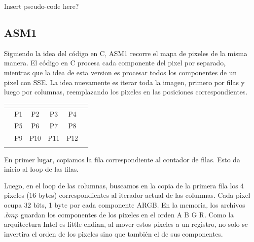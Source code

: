 Insert pseudo-code here?

\pagebreak

\subsection{ASM1}
Siguiendo la idea del código en C, ASM1 recorre el mapa de pixeles de la misma manera. El código en C procesa cada componente del pixel por separado, mientras que la idea de esta version es procesar todos los componentes de un pixel con SSE. La idea nuevamente es iterar toda la imagen, primero por filas y luego por columnas, reemplazando los pixeles en las posiciones correspondientes.

\begin{table}[h]
\mem
\begin{tabular}{l|c|c|c|c|l}
 & \multicolumn{1}{l|}{}      & \multicolumn{1}{l|}{}       & \multicolumn{1}{l|}{}       & \multicolumn{1}{l|}{}       &  \\ \hline
 & \cellcolor[HTML]{FFCB2F}P1 & \cellcolor[HTML]{FFCB2F}P2  & \cellcolor[HTML]{FFCB2F}P3  & \cellcolor[HTML]{FD6864}P4  &  \\ \hline
 & \cellcolor[HTML]{FFCB2F}P5 & \cellcolor[HTML]{FFFC9E}P6  & \cellcolor[HTML]{FFCB2F}P7  & \cellcolor[HTML]{FD6864}P8  &  \\ \hline
 & \cellcolor[HTML]{FFCB2F}P9 & \cellcolor[HTML]{FFCB2F}P10 & \cellcolor[HTML]{FFCB2F}P11 & \cellcolor[HTML]{FD6864}P12 &  \\ \hline
 & \multicolumn{1}{l|}{}      & \multicolumn{1}{l|}{}       & \multicolumn{1}{l|}{}       & \multicolumn{1}{l|}{}       & 
\end{tabular}
\end{table}
En primer lugar, copiamos la fila correspondiente al contador de filas. Esto da inicio al loop de las filas.

Luego, en el loop de las columnas, buscamos en la copia de la primera fila los 4 pixeles (16 bytes) correspondientes al iterador actual de las columnas. Cada pixel ocupa 32 bits, 1 byte por cada componente ARGB. En la memoria, los archivos $.bmp$ guardan los componentes de los pixeles en el orden A B G R. Como la arquitectura Intel es little-endian, al mover estos pixeles a un registro, no solo se invertira el orden de los pixeles sino que también el de sus componentes.

\mem
{}


